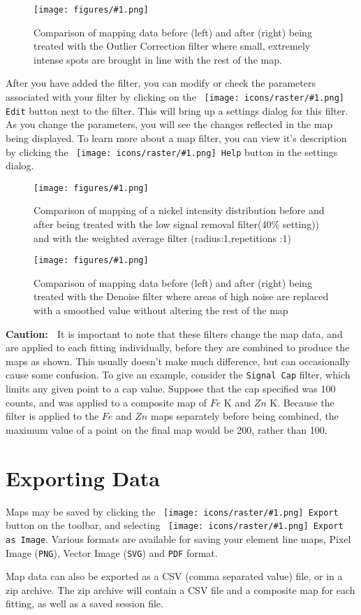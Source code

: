 \documentclass[article,twoside,11pt]{report}
\newcommand{\command}[1]{\texttt{#1}}
\newcommand{\icon}[1]{\texttt{[image: icons/raster/\#1.png]}}
\newcommand{\button}[2]{\ \command{\icon{#1} #2}}
\newcommand{\element}[1]{$#1$}
\newcommand{\caution}{{\bf \textcolor{BrickRed}{Caution: }\ }}
\newcommand{\screenshot}[2]{%
\begin{figure}[h!]
\centering\texttt{[image: figures/\#1.png]}
\caption{#2}
\end{figure}
}
\newcommand{\tocsection}[1]{\section*{#1}\addcontentsline{toc}{section}{#1}}
\begin{document}
\screenshot{map-filter-outliers}{Comparison of mapping data before (left) and after (right) being treated with the Outlier Correction filter where small, extremely intense spots are brought in line with the rest of the map.}

After you have added the filter, you can modify or check the parameters associated with your filter by clicking on the \button{misc-preferences}{Edit} button next to the filter. This will bring up a settings dialog for this filter. As you change the parameters, you will see the changes reflected in the map being displayed. To learn more about a map filter, you can view it's description by clicking the \button{badge-help}{Help} button in the settings dialog.

\screenshot{map-filter-lowsignal}{Comparison of mapping of a nickel intensity distribution before and after being treated with the low signal removal filter(40\% setting)) and with the weighted average filter (radius:1,repetitions :1)}

\screenshot{map-filter-denoise}{Comparison of mapping data before (left) and after (right) being treated with the Denoise filter where areas of high noise are replaced with a smoothed value without altering the rest of the map}

\caution It is important to note that these filters change the map data, and are applied to each fitting individually, before they are combined to produce the maps as shown. This usually doesn't make much difference, but can occasionally cause some confusion. To give an example, consider the \command{Signal Cap} filter, which limits any given point to a cap value. Suppose that the cap specified was 100 counts, and was applied to a composite map of \element{Fe} K and \element{Zn} K. Because the filter is applied to the \element{Fe} and \element{Zn} maps separately before being combined, the maximum value of a point on the final map would be 200, rather than 100.

\tocsection{Exporting Data}

Maps may be saved by clicking the \button{document-export}{Export} button on the toolbar, and selecting \button{mime-raster}{Export as Image}. Various formats are available for saving your element line maps, Pixel Image (\command{PNG}), Vector Image (\command{SVG}) and \command{PDF} format.

Map data can also be exported as a CSV (comma separated value) file, or in a zip archive. The zip archive will contain a CSV file and a composite map for each fitting, as well as a saved session file.
\end{document}
